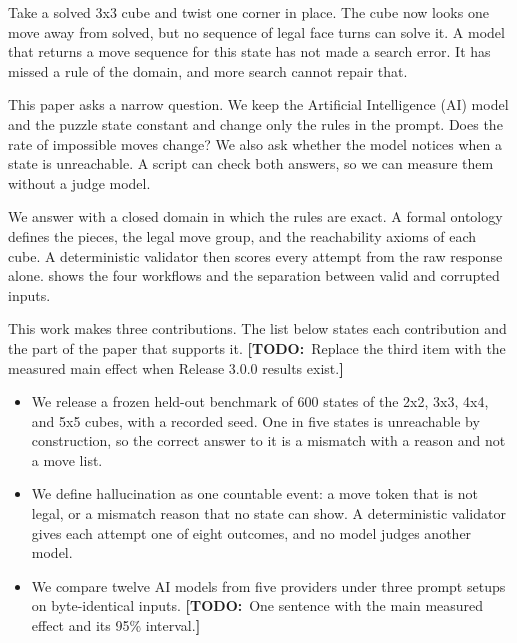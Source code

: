 \documentclass[10pt,twocolumn,letterpaper]{article}
\newcommand{\todo}[1]{{\color{red!70!black}\textbf{[TODO:}~#1\textbf{]}}}
\begin{document}
Take a solved 3x3 cube and twist one corner in place. The cube now looks one move away from solved, but no sequence of legal face turns can solve it. A model that returns a move sequence for this state has not made a search error. It has missed a rule of the domain, and more search cannot repair that.

This paper asks a narrow question. We keep the Artificial Intelligence (AI) model and the puzzle state constant and change only the rules in the prompt. Does the rate of impossible moves change? We also ask whether the model notices when a state is unreachable. A script can check both answers, so we can measure them without a judge model.

We answer with a closed domain in which the rules are exact. A formal ontology defines the pieces, the legal move group, and the reachability axioms of each cube. A deterministic validator then scores every attempt from the raw response alone.  shows the four workflows and the separation between valid and corrupted inputs.

This work makes three contributions. The list below states each contribution and the part of the paper that supports it. \todo{Replace the third item with the measured main effect when Release 3.0.0 results exist.}
\begin{itemize}[leftmargin=*,itemsep=1pt]
  \item We release a frozen held-out benchmark of 600 states of the 2x2, 3x3, 4x4, and 5x5 cubes, with a recorded seed. One in five states is unreachable by construction, so the correct answer to it is a mismatch with a reason and not a move list.
  \item We define hallucination as one countable event: a move token that is not legal, or a mismatch reason that no state can show. A deterministic validator gives each attempt one of eight outcomes, and no model judges another model.
  \item We compare twelve AI models from five providers under three prompt setups on byte-identical inputs. \todo{One sentence with the main measured effect and its 95\% interval.}
\end{itemize}
\end{document}

